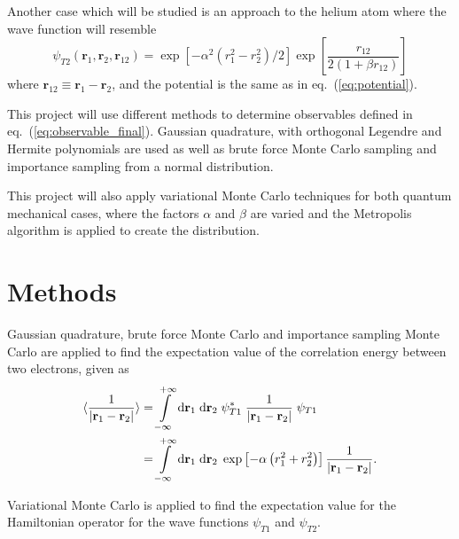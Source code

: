 \documentclass[a4paper,11pt]{article}
\newcommand{\diff}{\ensuremath{\; \text{d}}}
\begin{document}
Another case which will be studied is an approach to the helium atom where the wave function will resemble 
\begin{equation}
    \psi_{T2}(\mathbf{r}_1, \mathbf{r}_2, \mathbf{r}_{12}) = \exp \left[ -\alpha^2 \left( r_1^2 - r_2^2 \right)/2 \right] \exp \left[ \frac{r_{12}}{2(1 + \beta r_{12})} \right]
    \label{eq:wavefuncT2}
\end{equation}
where $\mathbf{r}_{12} \equiv \mathbf{r}_1 - \mathbf{r}_2$, and the potential is the same as in eq.~(\ref{eq:potential}).

This project will use different methods to determine observables defined in eq.~(\ref{eq:observable_final}). Gaussian quadrature, with orthogonal Legendre and Hermite polynomials are used as well as brute force Monte Carlo sampling and importance sampling from a normal distribution. 

This project will also apply variational Monte Carlo techniques for both quantum mechanical cases, where the factors $\alpha$ and $\beta$ are varied and the Metropolis algorithm is applied to create the distribution. 

\section{Methods}
Gaussian quadrature, brute force Monte Carlo and importance sampling Monte Carlo are applied to find the expectation value of the correlation energy between two electrons, given as
\begin{align}
    \langle \frac{1}{| \mathbf{r}_1 - \mathbf{r}_2 |} \rangle &= \int\limits_{-\infty}^{+\infty} \! \diff \mathbf{r}_1 \diff \mathbf{r}_2 \; \psi_{T1}^* \; \frac{1}{|\mathbf{r}_1 - \mathbf{r}_2 |} \; \psi_{T1} \notag \\
    &= \int\limits_{-\infty}^{+\infty} \! \diff \mathbf{r}_1 \diff \mathbf{r}_2 \; \exp\left[ -\alpha \left( r_1^2 + r_2^2 \right) \right] \frac{1}{|\mathbf{r}_1 - \mathbf{r}_2 |}.
    \label{eq:exp_corr_energy}
\end{align}

Variational Monte Carlo is applied to find the expectation value for the Hamiltonian operator for the wave functions $\psi_{T1}$ and $\psi_{T2}$. 
\end{document}
